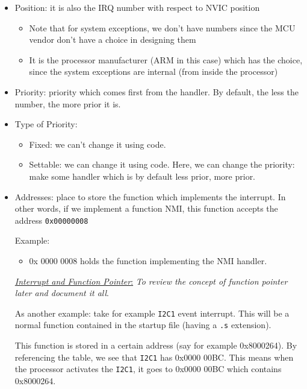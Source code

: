 \begin{itemize}
    \item Position: it is also the IRQ number with respect to NVIC position
    
    	\begin{itemize}
    	\item Note that for system exceptions, we don't have numbers since the MCU vendor don't have a choice in designing them
    	
    	\item It is the processor manufacturer (ARM in this case) which has the choice, since the system exceptions are internal (from inside the processor)
    	\end{itemize}

    \item Priority: priority which comes first from the handler. By default, the less the number, the more prior it is.

    \item Type of Priority: 

    \begin{itemize}
        \item Fixed: we can't change it using code.

        \item Settable: we can change it using code. Here, we can change the priority: make some handler which is by default less prior, more prior.
    \end{itemize}


    \item Addresses: place to store the function which implements the interrupt. In other words, if we implement a function NMI, this function accepts the address \verb|0x00000008| 
    
    Example:

    \begin{itemize}
        \item 0x 0000 0008 holds the function implementing the NMI handler.
    \end{itemize}

     \underline{\textit{Interrupt and Function Pointer}:} \textit{To review the concept of function pointer later and document it all}.

    As another example: take for example \verb|I2C1| event interrupt. This will be a normal function contained in the startup file (having a \verb|.s| extension). 
    
    This function is stored in a certain address (say for example 0x8000264). By referencing the table, we see that \verb|I2C1| has 0x0000 00BC. This means when the processor activates the \verb|I2C1|, it goes to 0x0000 00BC which contains 0x8000264.
    
    
\end{itemize}


